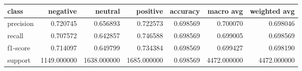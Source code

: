 \begin{tabular}{lrrrrrr}
\toprule
class & negative & neutral & positive & accuracy & macro avg & weighted avg \\
\midrule
precision & 0.720745 & 0.656893 & 0.722573 & 0.698569 & 0.700070 & 0.698046 \\
recall & 0.707572 & 0.642857 & 0.746588 & 0.698569 & 0.699005 & 0.698569 \\
f1-score & 0.714097 & 0.649799 & 0.734384 & 0.698569 & 0.699427 & 0.698190 \\
support & 1149.000000 & 1638.000000 & 1685.000000 & 0.698569 & 4472.000000 & 4472.000000 \\
\bottomrule
\end{tabular}

